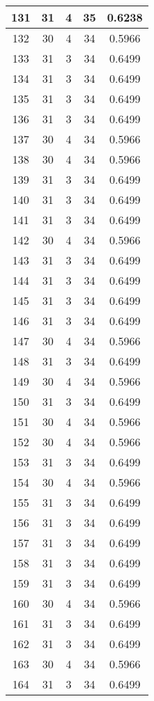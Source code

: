 \documentclass[letterpaper, 12pt]{article}
\begin{document}
\begin{longtable}{|c|c|c|c|c|}
\hline
131 & 31 & 4 & 35 & 0.6238 \\
\hline
132 & 30 & 4 & 34 & 0.5966 \\
\hline
133 & 31 & 3 & 34 & 0.6499 \\
\hline
134 & 31 & 3 & 34 & 0.6499 \\
\hline
135 & 31 & 3 & 34 & 0.6499 \\
\hline
136 & 31 & 3 & 34 & 0.6499 \\
\hline
137 & 30 & 4 & 34 & 0.5966 \\
\hline
138 & 30 & 4 & 34 & 0.5966 \\
\hline
139 & 31 & 3 & 34 & 0.6499 \\
\hline
140 & 31 & 3 & 34 & 0.6499 \\
\hline
141 & 31 & 3 & 34 & 0.6499 \\
\hline
142 & 30 & 4 & 34 & 0.5966 \\
\hline
143 & 31 & 3 & 34 & 0.6499 \\
\hline
144 & 31 & 3 & 34 & 0.6499 \\
\hline
145 & 31 & 3 & 34 & 0.6499 \\
\hline
146 & 31 & 3 & 34 & 0.6499 \\
\hline
147 & 30 & 4 & 34 & 0.5966 \\
\hline
148 & 31 & 3 & 34 & 0.6499 \\
\hline
149 & 30 & 4 & 34 & 0.5966 \\
\hline
150 & 31 & 3 & 34 & 0.6499 \\
\hline
151 & 30 & 4 & 34 & 0.5966 \\
\hline
152 & 30 & 4 & 34 & 0.5966 \\
\hline
153 & 31 & 3 & 34 & 0.6499 \\
\hline
154 & 30 & 4 & 34 & 0.5966 \\
\hline
155 & 31 & 3 & 34 & 0.6499 \\
\hline
156 & 31 & 3 & 34 & 0.6499 \\
\hline
157 & 31 & 3 & 34 & 0.6499 \\
\hline
158 & 31 & 3 & 34 & 0.6499 \\
\hline
159 & 31 & 3 & 34 & 0.6499 \\
\hline
160 & 30 & 4 & 34 & 0.5966 \\
\hline
161 & 31 & 3 & 34 & 0.6499 \\
\hline
162 & 31 & 3 & 34 & 0.6499 \\
\hline
163 & 30 & 4 & 34 & 0.5966 \\
\hline
164 & 31 & 3 & 34 & 0.6499 \\

\end{longtable}
\end{document}
